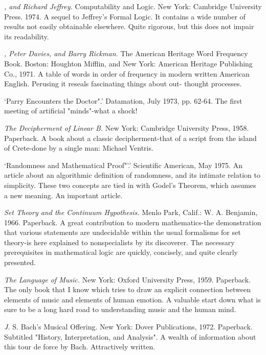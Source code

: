  {\sl , and Richard Jeffrey.} Computability and Logic. New York: Cambridge University Press. 1974. A sequel to Jeffrey's Formal Logic. It contains a wide number of results not easily obtainable elsewhere. Quite rigorous, but this does not impair its readability.

 {\sl , Peter Davies, and Barry Rickman.} The American Heritage Word Frequency Book. Boston: Houghton Mifflin, and New York: American Heritage Publishing Co., 1971. A table of words in order of frequency in modern written American English. Perusing it reseals fascinating things about out- thought processes.

 `Parry Encounters the Doctor".' Datamation, July 1973, pp. 62-64. The first meeting of artificial "minds"-what a shock!

 {\sl The Decipherment of Linear B.} New York: Cambridge University Press, 1958. Paperback. A book about a classic decipherment-that of a script from the island of Crete-done by a single man: Michael Ventris.

 `Randomness and Mathematical Proof"'.' Scientific American, May 1975. An article about an algorithmic definition of randomness, and its intimate relation to simplicity. These two concepts are tied in with Godel's Theorem, which assumes a new meaning. An important article.

 {\sl Set Theory and the Continuum Hypothesis.} Menlo Park, Calif.: W. A. Benjamin, 1966. Paperback. A great contribution to modern mathematics-the demonstration that various statements are undecidable within the usual formalisms for set theory-is here explained to nonspecialists by its discoverer. The necessary prerequisites in mathematical logic are quickly, concisely, and quite clearly presented.

 {\sl The Language of Music.} New York: Oxford University Press, 1959. Paperback. The only book that I know which tries to draw an explicit connection between elements of music and elements of human emotion. A valuable start down what is sure to be a long hard road to understanding music and the human mind.

 {\sl J.} \llap{*\enspace}S. Bach's Musical Offering. New York: Dover Publications, 1972. Paperback. Subtitled "History, Interpretation, and Analysis". A wealth of information about this tour de force by Bach. Attractively written.

